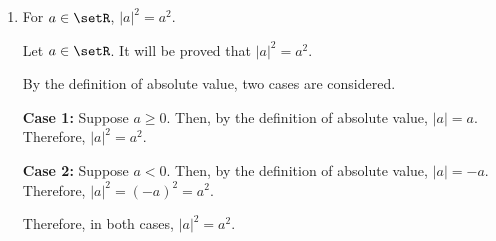\begin{enumerate}
\begin{enumerate}
\begin{subprove}
      \textbf{Case 1:} Suppose \(a \ge 0\) and \(b \ge 0\).
      Then, by the definition of absolute value, \(|a| = a\) and \(|b| = b\).
      Since \(a \ge 0\) and \(b \ge 0\), it follows that \(ab \ge 0\).
      Therefore, \(|ab| = ab = |a| \cdot |b|\).
      
      \textbf{Case 2:} Suppose \(a \ge 0\) and \(b < 0\).
      Then, by the definition of absolute value, \(|a| = a\) and \(|b| = -b\).
      Since \(a \ge 0\) and \(b < 0\), it follows that \(ab < 0\).
      Therefore, \(|ab| = -(ab) = -ab = a(-b) = |a| \cdot |b|\).
      
      \textbf{Case 3:} Suppose \(a < 0\) and \(b \ge 0\).
      Then, by the definition of absolute value, \(|a| = -a\) and \(|b| = b\).
      Since \(a < 0\) and \(b \ge 0\), it follows that \(ab < 0\).
      Therefore, \(|ab| = -(ab) = -ab = (-a)b = |a| \cdot |b|\).
      
      \textbf{Case 4:} Suppose \(a < 0\) and \(b < 0\).
      Then, by the definition of absolute value, \(|a| = -a\) and \(|b| = -b\).
      Since \(a < 0\) and \(b < 0\), it follows that \(ab > 0\).
      Therefore, \(|ab| = ab = (-a)(-b) = |a| \cdot |b|\).
      
      \textbf{Case 5:} Suppose \(a = 0\) or \(b = 0\).
      Then \(ab = 0\), so \(|ab| = 0\).
      If \(a = 0\), then \(|a| = 0\), so \(|a| \cdot |b| = 0 \cdot |b| = 0\).
      If \(b = 0\), then \(|b| = 0\), so \(|a| \cdot |b| = |a| \cdot 0 = 0\).
      Therefore, \(|ab| = 0 = |a| \cdot |b|\).
      
      Therefore, in all cases, \(|ab| = |a| \cdot |b|\).
    \end{subprove}
    \item For \(a\in\setR\), \(|a|^2=a^2\).
    \begin{subprove}
      Let \(a \in \setR\).
      It will be proved that \(|a|^2 = a^2\).
      
      By the definition of absolute value, two cases are considered.
      
      \textbf{Case 1:} Suppose \(a \ge 0\).
      Then, by the definition of absolute value, \(|a| = a\).
      Therefore, \(|a|^2 = a^2\).
      
      \textbf{Case 2:} Suppose \(a < 0\).
      Then, by the definition of absolute value, \(|a| = -a\).
      Therefore, \(|a|^2 = (-a)^2 = a^2\).
      
      Therefore, in both cases, \(|a|^2 = a^2\).
    \end{subprove}
  \end{enumerate}


\end{enumerate}
